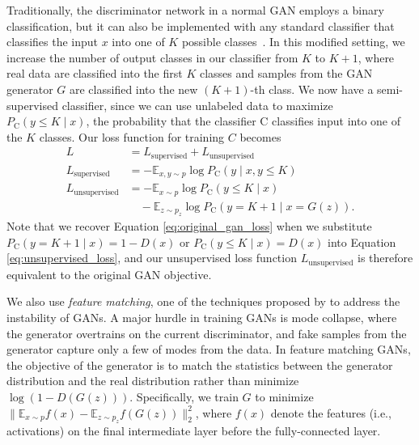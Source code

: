 \documentclass[fleqn,usenatbib]{mnras}
\newcommand{\ie}{{i.e., }}
\begin{document}
Traditionally, the discriminator network in a normal GAN employs a binary classification,
but it can also be implemented with any standard classifier that classifies the input $x$
into one of $K$ possible classes~\citep{salimans2016improved, odena2016semi}.
In this modified setting, we increase the number of output classes in our classifier from $K$ to $K+1$,
where real data are classified into the first $K$ classes and samples from the GAN generator $G$ are
classified into the new $\left( K + 1 \right)$-th class.
We now have a semi-supervised classifier, since we can use unlabeled data to maximize
$P_{\mathrm{C}} \left( y \leq K \mid x \right)$,
the probability that the classifier $\mathrm{C}$ classifies input into one of the $K$ classes.
Our loss function for training $C$ becomes
\begin{align}
  L &= L_{\text{supervised}} + L_{\text{unsupervised}}
    \label{eq:total_loss} \\
  L_{\text{supervised}} &= -\mathbb{E}_{x, y \sim p} \log P_{\mathrm{C}} \left( y \mid x, y \leq K \right)
    \label{eq:supervised_loss} \\
  L_{\text{unsupervised}} &= - \mathbb{E}_{x \sim p} \log P_{\mathrm{C}} \left( y \leq K \mid x \right) \nonumber \\
    & \quad - \mathbb{E}_{z \sim p_z} \log P_{\mathrm{C}} \left( y = K + 1 \mid x = G \left( z \right) \right).
    \label{eq:unsupervised_loss}
\end{align}
Note that we recover Equation \ref{eq:original_gan_loss} when we substitute
$P_{\mathrm{C}} \left ( y = K + 1 \mid x \right) = 1 - D(x)$ or
$P_{\mathrm{C}} \left( y \leq K \mid x \right) = D(x)$ into Equation \ref{eq:unsupervised_loss},
and our unsupervised loss function $L_{\text{unsupervised}}$ is therefore equivalent to the original GAN objective.

We also use \textit{feature matching}, one of the techniques proposed by \citet{salimans2016improved} to address
the instability of GANs.
A major hurdle in training GANs is mode collapse, where the generator overtrains on the current discriminator,
and fake samples from the generator capture only a few of modes from the data.
In feature matching GANs, the objective of the generator is to match the statistics between the generator distribution
and the real distribution rather than minimize $\log \left( 1 - D \left( G \left( z \right) \right) \right)$.
Specifically, we train $G$ to minimize
$ \big\lVert \mathbb{E}_{x \sim p} f \left( x \right) - \mathbb{E}_{z \sim p_z} f \left( G \left( z \right) \right) \big\rVert^2_2$,
where $f(x)$ denote the features (\ie activations) on the final intermediate layer before the fully-connected layer.
\end{document}
